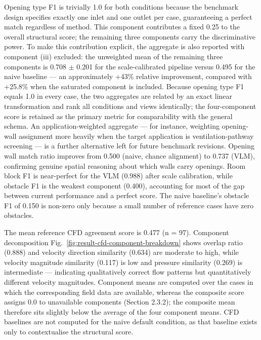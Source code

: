 \documentclass[preprint,12pt,number]{elsarticle}
\begin{document}
Opening type F1 is trivially 1.0 for both conditions because the benchmark design specifies exactly one inlet and one outlet per case, guaranteeing a perfect match regardless of method. This component contributes a fixed 0.25 to the overall structural score; the remaining three components carry the discriminative power. To make this contribution explicit, the aggregate is also reported with component (iii) excluded: the unweighted mean of the remaining three components is 0.708 $\pm$ 0.201 for the scale-calibrated pipeline versus 0.495 for the naive baseline --- an approximately +43\% relative improvement, compared with +25.8\% when the saturated component is included. Because opening type F1 equals 1.0 in every case, the two aggregates are related by an exact linear transformation and rank all conditions and views identically; the four-component score is retained as the primary metric for comparability with the general schema. An application-weighted aggregate --- for instance, weighting opening-wall assignment more heavily when the target application is ventilation-pathway screening --- is a further alternative left for future benchmark revisions. Opening wall match ratio improves from 0.500 (naive, chance alignment) to 0.737 (VLM), confirming genuine spatial reasoning about which walls carry openings. Room block F1 is near-perfect for the VLM (0.988) after scale calibration, while obstacle F1 is the weakest component (0.400), accounting for most of the gap between current performance and a perfect score. The naive baseline's obstacle F1 of 0.150 is non-zero only because a small number of reference cases have zero obstacles.

The mean reference CFD agreement score is 0.477 (n = 97). Component decomposition Fig.~\ref{fig:result-cfd-component-breakdown} shows overlap ratio (0.888) and velocity direction similarity (0.634) are moderate to high, while velocity magnitude similarity (0.117) is low and pressure similarity (0.269) is intermediate --- indicating qualitatively correct flow patterns but quantitatively different velocity magnitudes. Component means are computed over the cases in which the corresponding field data are available, whereas the composite score assigns 0.0 to unavailable components (Section 2.3.2); the composite mean therefore sits slightly below the average of the four component means. CFD baselines are not computed for the naive default condition, as that baseline exists only to contextualise the structural score.
\end{document}
